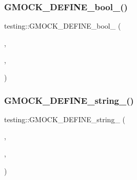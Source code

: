 \mbox{\label{namespacetesting_aca5af0e8943ba53352537ab84233b47f}} 
\subsubsection{\texorpdfstring{G\+M\+O\+C\+K\+\_\+\+D\+E\+F\+I\+N\+E\+\_\+bool\+\_\+()}{GMOCK\_DEFINE\_bool\_()}}
{\footnotesize\ttfamily testing\+::\+G\+M\+O\+C\+K\+\_\+\+D\+E\+F\+I\+N\+E\+\_\+bool\+\_\+ (\begin{DoxyParamCaption}\item[{catch\+\_\+leaked\+\_\+mocks}]{,  }\item[{true}]{,  }\item[{\char`\"{}true iff Google \hyperlink{classtesting_1_1_mock}{Mock} should report leaked mock objects \char`\"{} \char`\"{}as failures.\char`\"{}}]{ }\end{DoxyParamCaption})}

\mbox{\label{namespacetesting_a16c4c37462184feebef44eb45e3fd98c}} 
\subsubsection{\texorpdfstring{G\+M\+O\+C\+K\+\_\+\+D\+E\+F\+I\+N\+E\+\_\+string\+\_\+()}{GMOCK\_DEFINE\_string\_()}}
{\footnotesize\ttfamily testing\+::\+G\+M\+O\+C\+K\+\_\+\+D\+E\+F\+I\+N\+E\+\_\+string\+\_\+ (\begin{DoxyParamCaption}\item[{verbose}]{,  }\item[{\hyperlink{namespacetesting_1_1internal_ad9386ccda6b6deac2f7b84784d3088c0}{internal\+::k\+Warning\+Verbosity}}]{,  }\item[{\char`\"{}Controls how verbose Google \hyperlink{classtesting_1_1_mock}{Mock}\textquotesingle{}s output is.\char`\"{} \char`\"{} Valid values\+:\textbackslash{} info -\/ prints all messages.\textbackslash{} \char`\"{} warning -\/ prints warnings and errors.\textbackslash{}\char`\"{} \char`\"{} error -\/ prints errors only.\char`\"{}}]{ }\end{DoxyParamCaption})}

